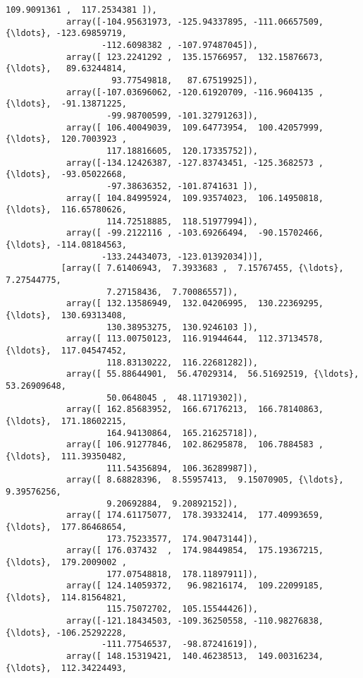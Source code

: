 \documentclass[11pt]{article}
\begin{document}
\begin{Verbatim}[commandchars=\\\{\}]
                    109.9091361 ,  117.2534381 ]),
            array([-104.95631973, -125.94337895, -111.06657509, {\ldots}, -123.69859719,
                   -112.6098382 , -107.97487045]),
            array([ 123.2241292 ,  135.15766957,  132.15876673, {\ldots},   89.63244814,
                     93.77549818,   87.67519925]),
            array([-107.03696062, -120.61920709, -116.9604135 , {\ldots},  -91.13871225,
                    -99.98700599, -101.32791263]),
            array([ 106.40049039,  109.64773954,  100.42057999, {\ldots},  120.7003923 ,
                    117.18816605,  120.17335752]),
            array([-134.12426387, -127.83743451, -125.3682573 , {\ldots},  -93.05022668,
                    -97.38636352, -101.8741631 ]),
            array([ 104.84995924,  109.93574023,  106.14950818, {\ldots},  116.65780626,
                    114.72518885,  118.51977994]),
            array([ -99.2122116 , -103.69266494,  -90.15702466, {\ldots}, -114.08184563,
                   -133.24434073, -123.01392034])],
           [array([ 7.61406943,  7.3933683 ,  7.15767455, {\ldots},  7.27544775,
                    7.27158436,  7.70086557]),
            array([ 132.13586949,  132.04206995,  130.22369295, {\ldots},  130.69313408,
                    130.38953275,  130.9246103 ]),
            array([ 113.00750123,  116.91944644,  112.37134578, {\ldots},  117.04547452,
                    118.83130222,  116.22681282]),
            array([ 55.88644901,  56.47029314,  56.51692519, {\ldots},  53.26909648,
                    50.0648045 ,  48.11719302]),
            array([ 162.85683952,  166.67176213,  166.78140863, {\ldots},  171.18602215,
                    164.94130864,  165.21625718]),
            array([ 106.91277846,  102.86295878,  106.7884583 , {\ldots},  111.39350482,
                    111.54356894,  106.36289987]),
            array([ 8.68828396,  8.55957413,  9.15070905, {\ldots},  9.39576256,
                    9.20692884,  9.20892152]),
            array([ 174.61175077,  178.39332414,  177.40993659, {\ldots},  177.86468654,
                    173.75233577,  174.90473144]),
            array([ 176.037432  ,  174.98449854,  175.19367215, {\ldots},  179.2009002 ,
                    177.07548818,  178.11897911]),
            array([ 124.14059372,   96.98216174,  109.22099185, {\ldots},  114.81564821,
                    115.75072702,  105.15544426]),
            array([-121.18434503, -109.36250558, -110.98276838, {\ldots}, -106.25292228,
                   -111.77546537,  -98.87241619]),
            array([ 148.15319421,  140.46238513,  149.00316234, {\ldots},  112.34224493,

\end{Verbatim}
\end{document}
